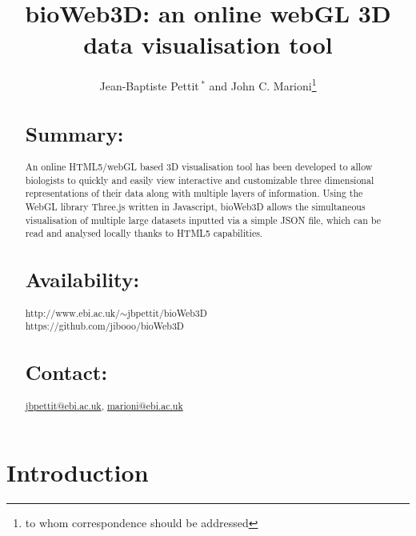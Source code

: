 \documentclass{bioinfo}
\begin{document}

\title[Application Note]{bioWeb3D: an online webGL 3D data visualisation tool}
\author[Pettit \textit{et~al}]{Jean-Baptiste Pettit\,$^{*}$ and John C. Marioni\footnote{to whom correspondence should be addressed}}
\address{EMBL-EBI, European Molecular Biology Laboratory - European Bioinformatics Institute, Cambridge, CB10 1SD, UK}



\maketitle

\begin{abstract}

\section{Summary:}
An online HTML5/webGL based 3D visualisation tool has been developed to allow biologists to quickly and easily view interactive and customizable three dimensional representations of their data along with multiple layers of information. Using the WebGL library Three.js written in Javascript, bioWeb3D allows the simultaneous visualisation of multiple large datasets inputted via a simple JSON file, which can be read and analysed locally thanks to HTML5 capabilities.

\section{Availability:}
http://www.ebi.ac.uk/$\sim$jbpettit/bioWeb3D \\ https://github.com/jibooo/bioWeb3D

\section{Contact:} \href{jbpettit@ebi.ac.uk}{jbpettit@ebi.ac.uk}, \href{marioni@ebi.ac.uk}{marioni@ebi.ac.uk}
\end{abstract}

\section{Introduction}
\end{document}
